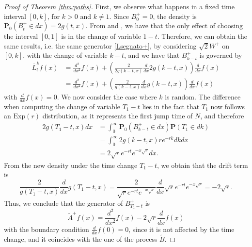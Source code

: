 \documentclass[11pt,a4paper]{article}
\theoremstyle{definition}
\theoremstyle{remark}
\begin{document}
	\begin{proof}[Proof of Theorem \ref{thm:paths}]
		First, we observe what happens in a fixed time interval \([0,k]\), for \(k>0\) and \(k \ne 1\). Since \(B^+_0=0\), the density is \(\mathbf{P}_0 (B^+_t \in dx) = 2 g(t,x)\).  
		From \cite[Theorem 2.1, Formula (2.4)]{reverse-diffusion1} and \cite[Lemma 2.1, Formula (2.8)]{reverse-reflected}, we have that the only effect of choosing the interval \([0,1]\) is in the change of variable \(1-t\). Therefore, we can obtain the same results, i.e. the same generator \eqref{Lsegnato+}, by considering \(\sqrt{2} W^+\) on \([0,k]\), with the change of variable \(k-t\), and we have that \(B^+_{k-t}\) is governed by
		\begin{align*}
			\overline{L}^k_t f(x)&= \frac{d^2}{dx^2} f(x) + \left(\frac{2}{2 g(k-t,x)} \frac{d}{dx} 2 g(k-t,x)\right) \frac{d}{dx} f(x)\\
			&= \frac{d^2}{dx^2} f(x) + \left(\frac{2}{ g(k-t,x)} \frac{d}{dx}  g(k-t,x)\right) \frac{d}{dx} f(x)
		\end{align*}
		with \(\frac{d}{dx} f(x)=0\).
		We now consider the case where \( k \) is random. The difference when computing the change of variable \( T_1 - t \) lies in the fact that \( T_1 \) now follows an \(\text{Exp}(r)\) distribution, as it represents the first jump time of \( N \), and therefore
		\begin{align*}
			2 g(T_1-t,x) dx&=\int_0^\infty \mathbf{P}_0(B^+_{k-t} \in dx) \mathbf{P}(T_1 \in dk)\\&=\int_0^\infty 2 g(k-t,x) r e^{-rk} dk dx\\
			&=2 \sqrt{r} e^{-rt} e^{-x\sqrt{r}} dx.
		\end{align*}
		From the new density under the time change \( T_1 - t \), we obtain that the drift term is  
		\[\frac{2}{ g(T_1-t,x)} \frac{d}{dx}  g(T_1-t,x) =  \frac{2}{\sqrt{r} e^{-rt} e^{-x\sqrt{r}}} \frac{d}{dx} \sqrt{r} e^{-rt} e^{-x\sqrt{r}}=-2\sqrt{r}. \]
		Thus, we conclude that the generator of \( B^+_{T_1 - t} \) is  
		\[	\widetilde{A}^+ f(x)= \frac{d^2}{dx^2} f(x) - 2 \sqrt{r} \frac{d}{dx} f(x)
		\]
		with the boundary condition \(\frac{d}{dx} f(0)=0\), since it is not affected by the time change, and it coincides with the one of the process \(\widetilde{B}\).
	\end{proof}
\end{document}
